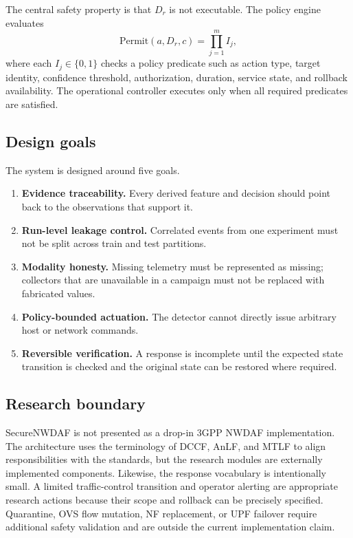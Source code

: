 \documentclass[sigconf,review]{acmart}
\begin{document}
The central safety property is that $D_r$ is not executable. The policy engine evaluates
\begin{equation}
\mathrm{Permit}(a,D_r,c)=\prod_{j=1}^{m} I_j,
\end{equation}
where each $I_j\in\{0,1\}$ checks a policy predicate such as action type, target identity, confidence threshold, authorization, duration, service state, and rollback availability. The operational controller executes only when all required predicates are satisfied.

\subsection{Design goals}
The system is designed around five goals.
\begin{enumerate}[leftmargin=*]
\item \textbf{Evidence traceability.} Every derived feature and decision should point back to the observations that support it.
\item \textbf{Run-level leakage control.} Correlated events from one experiment must not be split across train and test partitions.
\item \textbf{Modality honesty.} Missing telemetry must be represented as missing; collectors that are unavailable in a campaign must not be replaced with fabricated values.
\item \textbf{Policy-bounded actuation.} The detector cannot directly issue arbitrary host or network commands.
\item \textbf{Reversible verification.} A response is incomplete until the expected state transition is checked and the original state can be restored where required.
\end{enumerate}

\subsection{Research boundary}
SecureNWDAF is not presented as a drop-in 3GPP NWDAF implementation. The architecture uses the terminology of DCCF, AnLF, and MTLF to align responsibilities with the standards, but the research modules are externally implemented components. Likewise, the response vocabulary is intentionally small. A limited traffic-control transition and operator alerting are appropriate research actions because their scope and rollback can be precisely specified. Quarantine, OVS flow mutation, NF replacement, or UPF failover require additional safety validation and are outside the current implementation claim.
\end{document}
